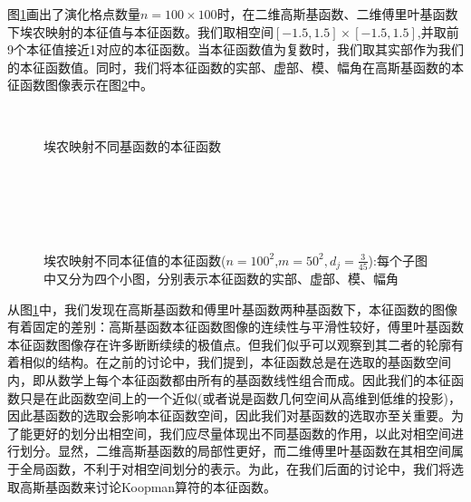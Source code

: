 图\ref{fig:henon_eig_RGFL}画出了演化格点数量$n=100\times 100$时，在二维高斯基函数、二维傅里叶基函数下埃农映射的本征值与本征函数。我们取相空间$[-1.5,1.5]\times [-1.5,1.5]$,并取前9个本征值接近1对应的本征函数。当本征函数值为复数时，我们取其实部作为我们的本征函数值。同时，我们将本征函数的实部、虚部、模、幅角在高斯基函数的本征函数图像表示在图\ref{fig:Henon_eigen_Gauss_n100m50md45_figure8}中。
\begin{figure}
    \centering
    \\
    \caption[埃农映射不同基函数的本征函数]{埃农映射不同基函数的本征函数}\label{fig:henon_eig_RGFL}
\end{figure}
\begin{figure}
  \centering
  \\
  \\
  \\
  \\
  \caption[埃农映射不同本征值的本征函数]{埃农映射不同本征值的本征函数($n=100^2$,$m=50^2,d_j=\frac{3}{45}$):每个子图中又分为四个小图，分别表示本征函数的实部、虚部、模、幅角}\label{fig:Henon_eigen_Gauss_n100m50md45_figure8}
\end{figure}

从图\ref{fig:henon_eig_RGFL}中，我们发现在高斯基函数和傅里叶基函数两种基函数下，本征函数的图像有着固定的差别：高斯基函数本征函数图像的连续性与平滑性较好，傅里叶基函数本征函数图像存在许多断断续续的极值点。但我们似乎可以观察到其二者的轮廓有着相似的结构。在之前的讨论中，我们提到，本征函数总是在选取的基函数空间内，即从数学上每个本征函数都由所有的基函数线性组合而成。因此我们的本征函数只是在此函数空间上的一个近似(或者说是函数几何空间从高维到低维的投影)，因此基函数的选取会影响本征函数空间，因此我们对基函数的选取亦至关重要。为了能更好的划分出相空间，我们应尽量体现出不同基函数的作用，以此对相空间进行划分。显然，二维高斯基函数的局部性更好，而二维傅里叶基函数在其相空间属于全局函数，不利于对相空间划分的表示。为此，在我们后面的讨论中，我们将选取高斯基函数来讨论Koopman算符的本征函数。


